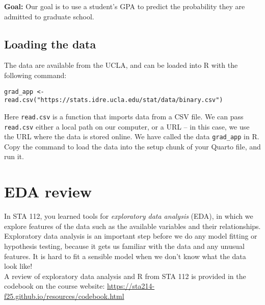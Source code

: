 \documentclass[11pt]{article}
\begin{document}
\noindent \textbf{Goal:} Our goal is to use a student's GPA to predict the probability they are admitted to graduate school.

\subsection*{Loading the data}

The data are available from the UCLA, and can be loaded into R with the following command:

\begin{verbatim}
grad_app <- read.csv("https://stats.idre.ucla.edu/stat/data/binary.csv")
\end{verbatim}

\noindent Here \texttt{read.csv} is a function that imports data from a CSV file. We can pass \texttt{read.csv} either a local path on our computer, or a URL -- in this case, we use the URL where the data is stored online. We have called the data \verb;grad_app; in R.\\

\noindent Copy the command to load the data into the setup chunk of your Quarto file, and run it.

\newpage

\section{EDA review}

In STA 112, you learned tools for \textit{exploratory data analysis} (EDA), in which we explore features of the data such as the available variables and their relationships. Exploratory data analysis is an important step before we do any model fitting or hypothesis testing, because it gets us familiar with the data and any unusual features. It is hard to fit a sensible model when we don't know what the data look like!\\

\noindent A review of exploratory data analysis and R from STA 112 is provided in the codebook on the course website: \url{https://sta214-f25.github.io/resources/codebook.html} 
\end{document}
